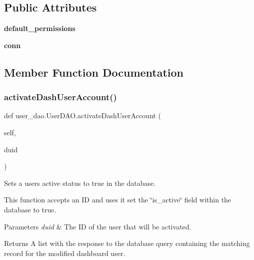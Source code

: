 \subsection*{Public Attributes}
\begin{DoxyCompactItemize}
\item 
\mbox{\label{classuser__dao_1_1_user_d_a_o_a5a46c18955252ca706d63e3d5ab638b6}} 
{\bfseries default\+\_\+permissions}
\item 
\mbox{\label{classuser__dao_1_1_user_d_a_o_a6f90077d5dfd89488f545983ea2923e0}} 
{\bfseries conn}
\end{DoxyCompactItemize}


\subsection{Member Function Documentation}
\mbox{\label{classuser__dao_1_1_user_d_a_o_a34053c2fc6389dbb0f4aae859706c821}} 
\subsubsection{\texorpdfstring{activate\+Dash\+User\+Account()}{activateDashUserAccount()}}
{\footnotesize\ttfamily def user\+\_\+dao.\+User\+D\+A\+O.\+activate\+Dash\+User\+Account (\begin{DoxyParamCaption}\item[{}]{self,  }\item[{}]{duid }\end{DoxyParamCaption})}



Sets a user\textquotesingle{}s active status to true in the database. 

This function accepts an ID and uses it set the \char`\"{}is\+\_\+active\char`\"{} field within the database to true.


\begin{DoxyParams}{Parameters}
{\em duid} & The ID of the user that will be activated.\\
\hline
\end{DoxyParams}
\begin{DoxyReturn}{Returns}
A list with the response to the database query containing the matching record for the modified dashboard user. 
\end{DoxyReturn}
\mbox{\label{classuser__dao_1_1_user_d_a_o_ac46cd5c48a42131a7ab09013cbde9faa}} 
